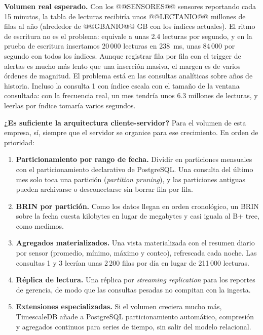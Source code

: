 \textbf{Volumen real esperado.} Con los @@SENSORES@@ sensores reportando cada 15 minutos, la tabla de lecturas recibiría unos @@LECTANIO@@ millones de filas al año (alrededor de @@GBANIO@@ GB con los índices actuales). El ritmo de escritura no es el problema: equivale a unas 2.4 lecturas por segundo, y en la prueba de escritura insertamos 20\,000 lecturas en 238~ms, unas 84\,000 por segundo con todos los índices. Aunque registrar fila por fila con el trigger de alertas es mucho más lento que una inserción masiva, el margen es de varios órdenes de magnitud. El problema está en las consultas analíticas sobre años de historia. Incluso la consulta 1 con índice escala con el tamaño de la ventana consultada: con la frecuencia real, un mes tendría unos 6.3 millones de lecturas, y leerlas por índice tomaría varios segundos.

\textbf{¿Es suficiente la arquitectura cliente-servidor?} Para el volumen de esta empresa, sí, siempre que el servidor se organice para ese crecimiento. En orden de prioridad:

\begin{enumerate}[leftmargin=1.6em,itemsep=0.15em]
\item \textbf{Particionamiento por rango de fecha.} Dividir  en particiones mensuales con el particionamiento declarativo de PostgreSQL. Una consulta del último mes solo toca una partición (\emph{partition pruning}), y las particiones antiguas pueden archivarse o desconectarse sin borrar fila por fila.
\item \textbf{BRIN por partición.} Como los datos llegan en orden cronológico, un BRIN sobre la fecha cuesta kilobytes en lugar de megabytes y casi iguala al B+ tree, como medimos.
\item \textbf{Agregados materializados.} Una vista materializada con el resumen diario por sensor (promedio, mínimo, máximo y conteo), refrescada cada noche. Las consultas 1 y 3 leerían unas 2\,200 filas por día en lugar de 211\,000 lecturas.
\item \textbf{Réplica de lectura.} Una réplica por \emph{streaming replication} para los reportes de gerencia, de modo que las consultas pesadas no compitan con la ingesta.
\item \textbf{Extensiones especializadas.} Si el volumen creciera mucho más, TimescaleDB añade a PostgreSQL particionamiento automático, compresión y agregados continuos para series de tiempo, sin salir del modelo relacional.
\end{enumerate}

